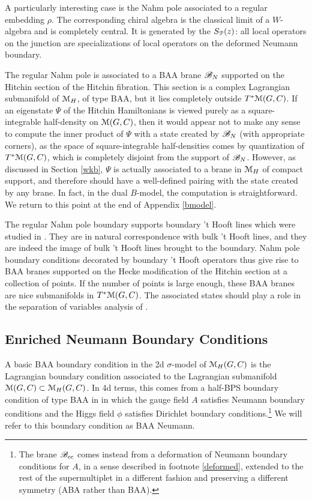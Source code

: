 \documentclass[11pt,a4paper]{article}
\begin{document}
A particularly interesting case is the Nahm pole associated to a regular embedding $\rho$. The corresponding chiral algebra is 
the classical limit of a $W$-algebra and is completely central. It is generated by the $S_{\cal P}(z)$: all local operators on the junction  
are specializations of local operators on the deformed Neumann boundary. 

The regular Nahm pole is associated to a BAA brane ${\mathscr B}_N$ supported on the Hitchin section of the Hitchin fibration. This section is a complex Lagrangian
submanifold of ${\mathcal M}_H$, of type BAA, but it  lies completely outside $T^*{\mathcal M}(G,C)$.
If an eigenstate $\Psi$ of the Hitchin Hamiltonians is viewed purely as a square-integrable half-density on ${\mathcal M}(G,C)$, then it would appear not to make any sense to compute
the inner product of $\Psi$ with a state created by ${\mathscr B}_N$ (with appropriate corners), as the space of square-integrable half-densities comes by quantization of
$T^*{\mathcal M}(G,C)$, which is completely disjoint from the support of ${\mathscr B}_N$.    However, as discussed in Section \ref{wkb}, $\Psi$ is actually associated to a brane in ${\mathcal M}_H$
of compact support, and therefore should have a well-defined pairing with the state created by any brane.   In fact, in the dual $B$-model, the computation is
straightforward.   We return to this point at the end of Appendix \ref{bmodel}.


The regular Nahm pole boundary supports boundary 't Hooft lines which were studied in \cite{Witten:2011zz}. They are in natural correspondence 
with bulk 't Hooft lines, and they are indeed the image of bulk 't Hooft lines brought to the boundary. Nahm pole boundary conditions decorated by boundary 
't Hooft operators thus give rise to BAA branes supported on the Hecke modification of the Hitchin section 
at a collection of points. If the number of points is large enough, these BAA branes are nice submanifolds in $T^*{\mathcal M}(G,C)$. The associated 
states should play a role in the separation of variables analysis of \cite{T}.

\subsection{Enriched Neumann Boundary Conditions}\label{Enriched}

A basic BAA boundary condition in the 2d $\sigma$-model of ${\mathcal M}_H(G,C)$ is the Lagrangian boundary condition associated
to the Lagrangian submanifold ${\mathcal M}(G,C)\subset {\mathcal M}_H(G,C)$.    In 4d terms, this comes 
from a half-BPS boundary condition of type BAA  in  in which the gauge field $A$ satisfies Neumann boundary conditions and the Higgs field  $\phi$
satisfies Dirichlet boundary conditions.\footnote{The brane ${\mathscr B}_{\mathrm{cc}}$ comes instead from  a deformation of Neumann boundary conditions for $A$, in a
sense described in footnote \ref{deformed}, extended to the rest
of the supermultiplet in a different fashion and preserving a different symmetry (ABA rather than BAA).}   We will refer to this boundary condition as BAA Neumann.
\end{document}
